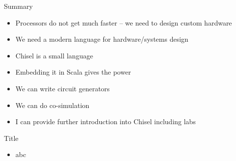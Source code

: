 \begin{frame}[fragile]{Summary}
\begin{itemize}
\item Processors do not get much faster -- we need to design custom hardware
\item We need a modern language for hardware/systems design
\item Chisel is a small language
\item Embedding it in Scala gives the power
\item We can write circuit generators
\item We can do co-simulation
\item I can provide further introduction into Chisel including labs
\end{itemize}
\end{frame}



\begin{frame}[fragile]{Title}
\begin{itemize}
\item abc
\end{itemize}
\end{frame}
